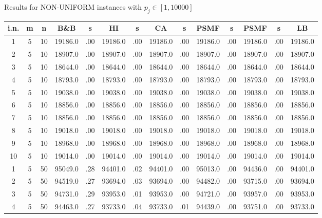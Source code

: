 \documentclass[12pt,a4paper]{article}
\begin{document}
\newpage
\begin{center}
{\footnotesize  Results for NON-UNIFORM instances with $p_j \in
[1,10000]$} {\tiny
\begin{tabular}{|ccc|cc|cc|cc|cc|cc|c|}\hline
{\bf i.n.}&{\bf m}&{\bf n}&{\bf B\&B}&{\bf s}&{\bf HI}&{\bf s}&{\bf
CA}&{\bf s}&{\bf PSMF}&{\bf s}&{\bf PSMF}&{\bf s}&{\bf LB}
\\\hline
1             &   5&  10&  19186.0&  .00&  19186.0&  .00&  19186.0&  .00&  19186.0&  .00&  19186.0&  .00&  19186.0\\[-0.01in]
2             &   5&  10&  18907.0&  .00&  18907.0&  .00&  18907.0&  .00&  18907.0&  .00&  18907.0&  .00&  18907.0\\[-0.01in]
3             &   5&  10&  18644.0&  .00&  18644.0&  .00&  18644.0&  .00&  18644.0&  .00&  18644.0&  .00&  18644.0\\[-0.01in]
4             &   5&  10&  18793.0&  .00&  18793.0&  .00&  18793.0&  .00&  18793.0&  .00&  18793.0&  .00&  18793.0\\[-0.01in]
5             &   5&  10&  19038.0&  .00&  19038.0&  .00&  19038.0&  .00&  19038.0&  .00&  19038.0&  .00&  19038.0\\[-0.01in]
6             &   5&  10&  18856.0&  .00&  18856.0&  .00&  18856.0&  .00&  18856.0&  .00&  18856.0&  .00&  18856.0\\[-0.01in]
7             &   5&  10&  18856.0&  .00&  18856.0&  .00&  18856.0&  .00&  18856.0&  .00&  18856.0&  .00&  18856.0\\[-0.01in]
8             &   5&  10&  19018.0&  .00&  19018.0&  .00&  19018.0&  .00&  19018.0&  .00&  19018.0&  .00&  19018.0\\[-0.01in]
9             &   5&  10&  18968.0&  .00&  18968.0&  .00&  18968.0&  .00&  18968.0&  .00&  18968.0&  .00&  18968.0\\[-0.01in]
10            &   5&  10&  19014.0&  .00&  19014.0&  .00&  19014.0&  .00&  19014.0&  .00&  19014.0&  .00&  19014.0\\[-0.01in]
1             &   5&  50&  95049.0&  .28&  94401.0&  .02&  94401.0&  .00&  95013.0&  .00&  94436.0&  .00&  94401.0\\[-0.01in]
2             &   5&  50&  94519.0&  .27&  93694.0&  .03&  93694.0&  .00&  94482.0&  .00&  93715.0&  .00&  93694.0\\[-0.01in]
3             &   5&  50&  94731.0&  .29&  93953.0&  .01&  93953.0&  .00&  94721.0&  .00&  93957.0&  .00&  93953.0\\[-0.01in]
4             &   5&  50&  94463.0&  .27&  93733.0&  .04&  93733.0&  .01&  94439.0&  .00&  93751.0&  .00&  93733.0\\[-0.01in]

\end{tabular}}
\end{center}
\end{document}
